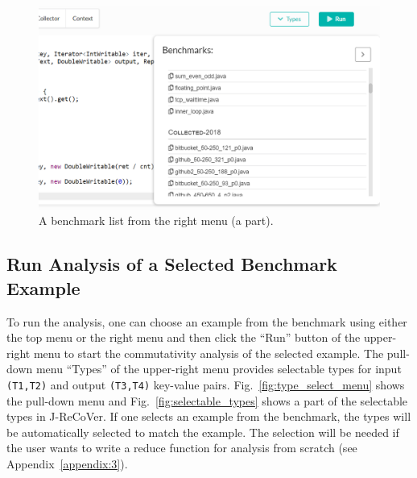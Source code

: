 \begin{figure}
\begin{center}
\includegraphics[width=.8\linewidth]{screenshots/benchmark_list_right}
\caption{A benchmark list from the right menu (a part).}
\label{fig:benchmark_list_right}
\end{center}
\end{figure}

\subsection{Run Analysis of a Selected Benchmark Example}
\label{appendix:2}

To run the analysis, one can choose an example from the benchmark using either
the top menu or the right menu and then click the ``Run'' button of the
upper-right menu to start the commutativity analysis of the selected example.
The pull-down menu ``Types'' of the upper-right menu provides selectable types
for input \texttt{(T1,T2)} and output \texttt{(T3,T4)} key-value pairs.
Fig.~\ref{fig:type_select_menu} shows the pull-down menu and
Fig.~\ref{fig:selectable_types} shows a part of the selectable types in
J-ReCoVer.  If one selects an example from the benchmark, the types will be
automatically selected to match the example. The selection will be needed if the
user wants to write a reduce function for analysis  from scratch (see
Appendix~\ref{appendix:3}).

